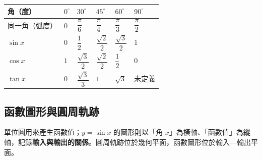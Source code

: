 \documentclass[11pt,a4paper]{article}
\newcounter{none}
\begin{document}
{\def\LTcaptype{none} %
\begin{longtable}[]{@{}
  >{\raggedleft\arraybackslash}p{}
  >{\raggedleft\arraybackslash}p{}
  >{\raggedleft\arraybackslash}p{}
  >{\raggedleft\arraybackslash}p{}
  >{\raggedleft\arraybackslash}p{}
  >{\raggedleft\arraybackslash}p{}@{}}
\toprule\noalign{}
\begin{minipage}[b]{\linewidth}\raggedleft
角（度）
\end{minipage} & \begin{minipage}[b]{\linewidth}\raggedleft
\(0^\circ\)
\end{minipage} & \begin{minipage}[b]{\linewidth}\raggedleft
\(30^\circ\)
\end{minipage} & \begin{minipage}[b]{\linewidth}\raggedleft
\(45^\circ\)
\end{minipage} & \begin{minipage}[b]{\linewidth}\raggedleft
\(60^\circ\)
\end{minipage} & \begin{minipage}[b]{\linewidth}\raggedleft
\(90^\circ\)
\end{minipage} \\
\midrule\noalign{}
\endhead
\bottomrule\noalign{}
\endlastfoot
同一角（弧度） & \(0\) & \(\dfrac{\pi}{6}\) & \(\dfrac{\pi}{4}\) & \(\dfrac{\pi}{3}\) & \(\dfrac{\pi}{2}\) \\
\(\sin x\) & \(0\) & \(\dfrac12\) & \(\dfrac{\sqrt2}{2}\) & \(\dfrac{\sqrt3}{2}\) & \(1\) \\
\(\cos x\) & \(1\) & \(\dfrac{\sqrt3}{2}\) & \(\dfrac{\sqrt2}{2}\) & \(\dfrac12\) & \(0\) \\
\(\tan x\) & \(0\) & \(\dfrac{\sqrt3}{3}\) & \(1\) & \(\sqrt3\) & 未定義 \\
\end{longtable}
}

\subsection{函數圖形與圓周軌跡}\label{ux51fdux6578ux5716ux5f62ux8207ux5713ux5468ux8eccux8de1}

單位圓用來產生函數值；\(y=\sin x\) 的圖形則以「角 \(x\)」為橫軸、「函數值」為縱軸，記錄\textbf{輸入與輸出的關係}。圓周軌跡位於幾何平面，函數圖形位於輸入---輸出平面。
\end{document}
